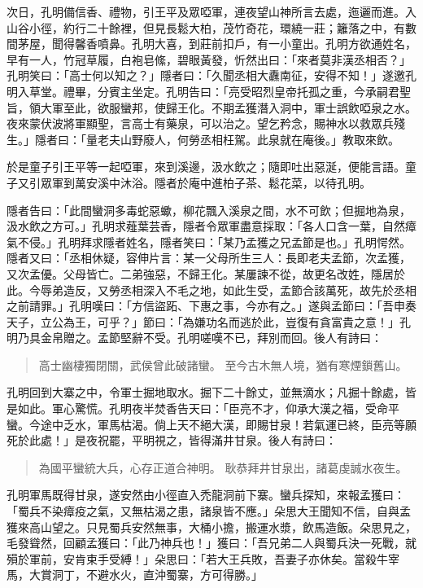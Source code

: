 次日，孔明備信香、禮物，引王平及眾啞軍，連夜望山神所言去處，迤邐而進。入山谷小徑，約行二十餘裡，但見長鬆大柏，茂竹奇花，環繞一莊；籬落之中，有數間茅屋，聞得馨香噴鼻。孔明大喜，到莊前扣戶，有一小童出。孔明方欲通姓名，早有一人，竹冠草履，白袍皂絛，碧眼黃發，忻然出曰：「來者莫非漢丞相否？」孔明笑曰：「高士何以知之？」隱者曰：「久聞丞相大纛南征，安得不知！」遂邀孔明入草堂。禮畢，分賓主坐定。孔明告曰：「亮受昭烈皇帝托孤之重，今承嗣君聖旨，領大軍至此，欲服蠻邦，使歸王化。不期孟獲潛入洞中，軍士誤飲啞泉之水。夜來蒙伏波將軍顯聖，言高士有藥泉，可以治之。望乞矜念，賜神水以救眾兵殘生。」隱者曰：「量老夫山野廢人，何勞丞相枉駕。此泉就在庵後。」教取來飲。

於是童子引王平等一起啞軍，來到溪邊，汲水飲之；隨即吐出惡涎，便能言語。童子又引眾軍到萬安溪中沐浴。隱者於庵中進柏子茶、鬆花菜，以待孔明。

隱者告曰：「此間蠻洞多毒蛇惡蠍，柳花飄入溪泉之間，水不可飲；但掘地為泉，汲水飲之方可。」孔明求薤葉芸香，隱者令眾軍盡意採取：「各人口含一葉，自然瘴氣不侵。」孔明拜求隱者姓名，隱者笑曰：「某乃孟獲之兄孟節是也。」孔明愕然。隱者又曰：「丞相休疑，容伸片言：某一父母所生三人：長即老夫孟節，次孟獲，又次孟優。父母皆亡。二弟強惡，不歸王化。某屢諫不從，故更名改姓，隱居於此。今辱弟造反，又勞丞相深入不毛之地，如此生受，孟節合該萬死，故先於丞相之前請罪。」孔明嘆曰：「方信盜跖、下惠之事，今亦有之。」遂與孟節曰：「吾申奏天子，立公為王，可乎？」節曰：「為嫌功名而逃於此，豈復有貪富貴之意！」孔明乃具金帛贈之。孟節堅辭不受。孔明嗟嘆不已，拜別而回。後人有詩曰：

\begin{quote}
高士幽棲獨閉關，武侯曾此破諸蠻。
至今古木無人境，猶有寒煙鎖舊山。
\end{quote}

孔明回到大寨之中，令軍士掘地取水。掘下二十餘丈，並無滴水；凡掘十餘處，皆是如此。軍心驚慌。孔明夜半焚香告天曰：「臣亮不才，仰承大漢之福，受命平蠻。今途中乏水，軍馬枯渴。倘上天不絕大漢，即賜甘泉！若氣運已終，臣亮等願死於此處！」是夜祝罷，平明視之，皆得滿井甘泉。後人有詩曰：

\begin{quote}
為國平蠻統大兵，心存正道合神明。
耿恭拜井甘泉出，諸葛虔誠水夜生。
\end{quote}

孔明軍馬既得甘泉，遂安然由小徑直入禿龍洞前下寨。蠻兵探知，來報孟獲曰：「蜀兵不染瘴疫之氣，又無枯渴之患，諸泉皆不應。」朵思大王聞知不信，自與孟獲來高山望之。只見蜀兵安然無事，大桶小擔，搬運水漿，飲馬造飯。朵思見之，毛發聳然，回顧孟獲曰：「此乃神兵也！」獲曰：「吾兄弟二人與蜀兵決一死戰，就殞於軍前，安肯束手受縛！」朵思曰：「若大王兵敗，吾妻子亦休矣。當殺牛宰馬，大賞洞丁，不避水火，直沖蜀寨，方可得勝。」

